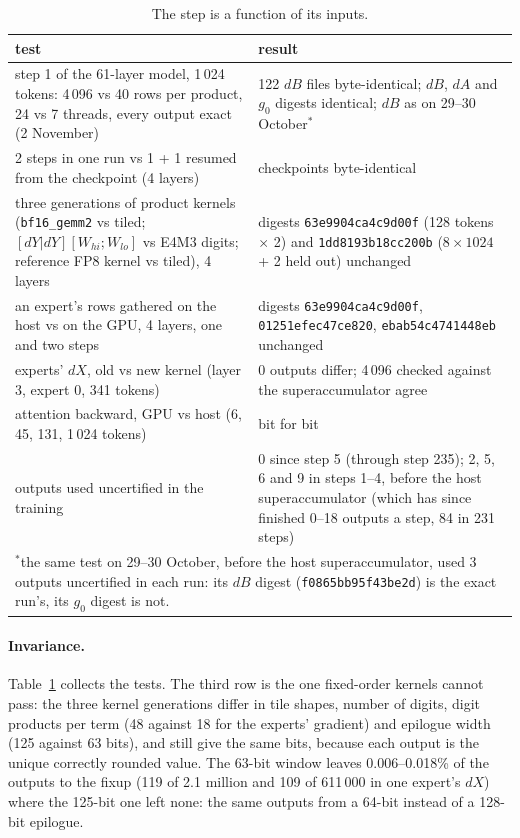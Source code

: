 \documentclass[11pt]{article}
\begin{document}
\begin{table}[t]\centering\small
\caption{The step is a function of its inputs.}\label{tab:verify}
\begin{tabular}{p{9.2cm}p{5.4cm}}\toprule
test & result \\\midrule
step 1 of the 61-layer model, 1\,024 tokens: 4\,096 vs 40 rows per product, 24 vs 7 threads, every output exact
(2 November) & 122 $dB$ files byte-identical; $dB$, $dA$ and $g_0$ digests identical; $dB$ as on 29--30 October$^{*}$ \\
2 steps in one run vs 1 + 1 resumed from the checkpoint (4 layers) & checkpoints byte-identical \\
three generations of product kernels (\texttt{bf16\_gemm2} vs tiled; $[dY|dY][W_{hi};W_{lo}]$ vs E4M3 digits; reference FP8
kernel vs tiled), 4 layers & digests \texttt{63e9904ca4c9d00f} (128 tokens $\times$ 2) and \texttt{1dd8193b18cc200b}
($8\times1024$ + 2 held out) unchanged \\
an expert's rows gathered on the host vs on the GPU, 4 layers, one and two steps & digests \texttt{63e9904ca4c9d00f},
\texttt{01251efec47ce820}, \texttt{ebab54c4741448eb} unchanged \\
experts' $dX$, old vs new kernel (layer 3, expert 0, 341 tokens) & 0 outputs differ; 4\,096 checked against the
superaccumulator agree \\
attention backward, GPU vs host (6, 45, 131, 1\,024 tokens) & bit for bit \\
outputs used uncertified in the training & 0 since step 5 (through step 235); 2, 5, 6 and 9 in steps 1--4, before the host
superaccumulator (which has since finished 0--18 outputs a step, 84 in 231 steps) \\\bottomrule
\multicolumn{2}{p{14.8cm}}{\footnotesize $^{*}$the same test on 29--30 October, before the host superaccumulator, used 3 outputs uncertified in
each run: its $dB$ digest (\texttt{f0865bb95f43be2d}) is the exact run's, its $g_0$ digest is not.}
\end{tabular}
\end{table}

\paragraph{Invariance.} Table~\ref{tab:verify} collects the tests. The third row is the one fixed-order kernels cannot pass:
the three kernel generations differ in tile shapes, number of digits, digit products per term (48 against 18 for the experts'
gradient) and epilogue width (125 against 63 bits), and still give the same bits, because each output is the unique correctly
rounded value. The 63-bit window leaves 0.006--0.018\% of the outputs to the fixup (119 of 2.1 million and 109 of 611\,000
in one expert's $dX$) where the 125-bit one left none: the same outputs from a 64-bit instead of a 128-bit epilogue.
\end{document}
